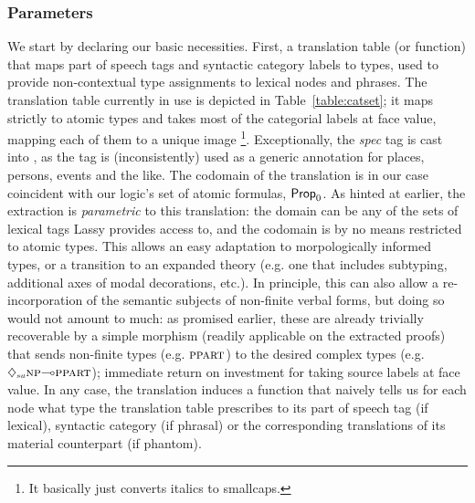 \subsubsection{Parameters}
We start by declaring our basic necessities.
First, a translation table (or function) that maps part of speech tags and syntactic category labels to types, used to provide non-contextual type assignments to lexical nodes and phrases.
The translation table currently in use is depicted in Table~\ref{table:catset}; it maps strictly to atomic types and takes most of the categorial labels at face value, mapping each of them to a unique image%
\footnote{It basically just converts italics to smallcaps.}.
Exceptionally, the \textit{spec} tag is cast into , as the tag is (inconsistently) used as a generic annotation for places, persons, events and the like.
The codomain of the translation is in our case coincident with our logic's set of atomic formulas, $\mathsf{Prop}_0$.
As hinted at earlier, the extraction is \textit{parametric} to this translation: the domain can be any of the sets of lexical tags Lassy provides access to, and the codomain is by no means restricted to atomic types.
This allows an easy adaptation to morpologically informed types, or a transition to an expanded theory (e.g. one that includes subtyping, additional axes of modal decorations, etc.). 
In principle, this can also allow a re-incorporation of the semantic subjects of non-finite verbal forms, but doing so would not amount to much: as promised earlier, these are already trivially recoverable by a simple morphism (readily applicable on the extracted proofs) that sends non-finite types (e.g. $\ppart[s]$) to the desired complex types (e.g. $\ddia{su}\np[s]\li\ppart[s]$); immediate return on investment for taking source labels at face value.
In any case, the translation induces a function that naively tells us for each node what type the translation table prescribes to its part of speech tag (if lexical), syntactic category (if phrasal) or the corresponding translations of its material counterpart (if phantom).

